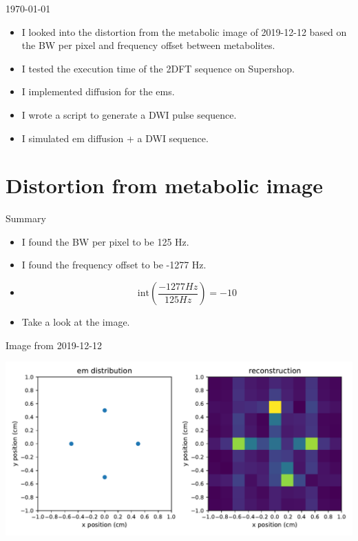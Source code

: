 \documentclass[dvipsnames]{beamer}
\begin{document}
\begin{frame}{\today}
\begin{itemize}
\item I looked into the distortion from the metabolic image of 2019-12-12 based on the BW per pixel and frequency offset between metabolites.
\item I tested the execution time of the 2DFT sequence on Supershop.
\item I implemented diffusion for the ems.
\item I wrote a script to generate a DWI pulse sequence.
\item I simulated em diffusion + a DWI sequence.
\end{itemize}
\end{frame}

\section{Distortion from metabolic image}

\begin{frame}{Summary}
\begin{itemize}
\item I found the BW per pixel to be 125 Hz.
\item I found the frequency offset to be -1277 Hz.
\item \begin{equation*} \mathrm{int}\left(\frac{-1277 Hz}{125 Hz} \right) = -10\end{equation*}
\item Take a look at the image.
\end{itemize}
\end{frame}

\begin{frame}{Image from 2019-12-12}
\begin{center}
\includegraphics[width=\textwidth]{reconstruction_metabolism-on-20percent}
\end{center}
\end{frame}
\end{document}
